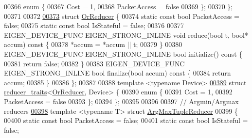 \begin{DoxyCode}
00366   \textcolor{keyword}{enum} \{
00367     Cost = 1,
00368     PacketAccess = \textcolor{keyword}{false}
00369   \};
00370 \};
00371 
00372 
\hyperlink{struct_eigen_1_1internal_1_1_or_reducer}{00373} \textcolor{keyword}{struct }\hyperlink{struct_eigen_1_1internal_1_1_or_reducer}{OrReducer} \{
00374   \textcolor{keyword}{static} \textcolor{keyword}{const} \textcolor{keywordtype}{bool} PacketAccess = \textcolor{keyword}{false};
00375   \textcolor{keyword}{static} \textcolor{keyword}{const} \textcolor{keywordtype}{bool} IsStateful = \textcolor{keyword}{false};
00376 
00377   EIGEN\_DEVICE\_FUNC EIGEN\_STRONG\_INLINE \textcolor{keywordtype}{void} reduce(\textcolor{keywordtype}{bool} t, \textcolor{keywordtype}{bool}* accum)\textcolor{keyword}{ const }\{
00378     *accum = *accum || t;
00379   \}
00380   EIGEN\_DEVICE\_FUNC EIGEN\_STRONG\_INLINE \textcolor{keywordtype}{bool} initialize()\textcolor{keyword}{ const }\{
00381     \textcolor{keywordflow}{return} \textcolor{keyword}{false};
00382   \}
00383   EIGEN\_DEVICE\_FUNC EIGEN\_STRONG\_INLINE \textcolor{keywordtype}{bool} finalize(\textcolor{keywordtype}{bool} accum)\textcolor{keyword}{ const }\{
00384     \textcolor{keywordflow}{return} accum;
00385   \}
00386 \};
00387 
00388 \textcolor{keyword}{template} <\textcolor{keyword}{typename} Device>
\hyperlink{struct_eigen_1_1internal_1_1reducer__traits_3_01_or_reducer_00_01_device_01_4}{00389} \textcolor{keyword}{struct }\hyperlink{struct_eigen_1_1internal_1_1reducer__traits}{reducer\_traits}<\hyperlink{struct_eigen_1_1internal_1_1_or_reducer}{OrReducer}, Device> \{
00390   \textcolor{keyword}{enum} \{
00391     Cost = 1,
00392     PacketAccess = \textcolor{keyword}{false}
00393   \};
00394 \};
00395 
00396 
00397 \textcolor{comment}{// Argmin/Argmax reducers}
\hyperlink{struct_eigen_1_1internal_1_1_arg_max_tuple_reducer}{00398} \textcolor{keyword}{template} <\textcolor{keyword}{typename} T> \textcolor{keyword}{struct }\hyperlink{struct_eigen_1_1internal_1_1_arg_max_tuple_reducer}{ArgMaxTupleReducer}
00399 \{
00400   \textcolor{keyword}{static} \textcolor{keyword}{const} \textcolor{keywordtype}{bool} PacketAccess = \textcolor{keyword}{false};
00401   \textcolor{keyword}{static} \textcolor{keyword}{const} \textcolor{keywordtype}{bool} IsStateful = \textcolor{keyword}{false};

\end{DoxyCode}
